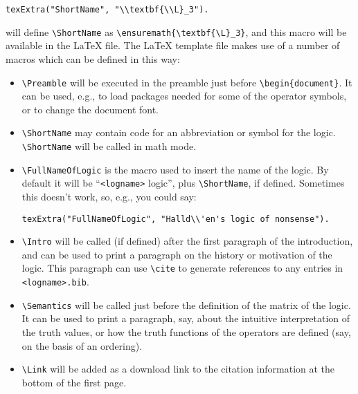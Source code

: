 \documentclass[]{article}
\begin{document}
\begin{itemize}
\begin{verbatim}
texExtra("ShortName", "\\textbf{\\L}_3").
\end{verbatim}

  will define \texttt{\textbackslash{}ShortName} as
  \texttt{\textbackslash{}ensuremath\{\textbackslash{}textbf\{\textbackslash{}L\}\_3\}},
  and this macro will be available in the LaTeX file. The LaTeX template
  file makes use of a number of macros which can be defined in this way:

  \begin{itemize}
  \item
    \texttt{\textbackslash{}Preamble} will be executed in the preamble
    just before \texttt{\textbackslash{}begin\{document\}}. It can be
    used, e.g., to load packages needed for some of the operator
    symbols, or to change the document font.
  \item
    \texttt{\textbackslash{}ShortName} may contain code for an
    abbreviation or symbol for the logic.
    \texttt{\textbackslash{}ShortName} will be called in math mode.
  \item
    \texttt{\textbackslash{}FullNameOfLogic} is the macro used to insert
    the name of the logic. By default it will be
    ``\texttt{\textless{}logname\textgreater{}} logic'', plus
    \texttt{\textbackslash{}ShortName}, if defined. Sometimes this
    doesn't work, so, e.g., you could say:

\begin{verbatim}
texExtra("FullNameOfLogic", "Halld\\'en's logic of nonsense").
\end{verbatim}
  \item
    \texttt{\textbackslash{}Intro} will be called (if defined) after the
    first paragraph of the introduction, and can be used to print a
    paragraph on the history or motivation of the logic. This paragraph
    can use \texttt{\textbackslash{}cite} to generate references to any
    entries in \texttt{\textless{}logname\textgreater{}.bib}.
  \item
    \texttt{\textbackslash{}Semantics} will be called just before the
    definition of the matrix of the logic. It can be used to print a
    paragraph, say, about the intuitive interpretation of the truth
    values, or how the truth functions of the operators are defined
    (say, on the basis of an ordering).
  \item
    \texttt{\textbackslash{}Link} will be added as a download link to
    the citation information at the bottom of the first page.
  \end{itemize}
\end{itemize}
\end{document}

